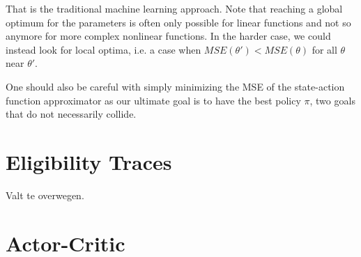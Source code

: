 That is the traditional machine learning approach.
Note that reaching a global optimum for the parameters
is often only possible for linear functions
and not so anymore for more complex nonlinear functions.
In the harder case, we could instead look for local optima,
i.e. a case when $MSE(\theta') < MSE(\theta)$
for all $\theta$ near $\theta'$.

One should also be careful with simply minimizing the MSE
of the state-action function approximator
as our ultimate goal is to have the best policy $\pi$,
two goals that do not necessarily collide.


\section{Eligibility Traces}
Valt te overwegen.

\section{Actor-Critic}
